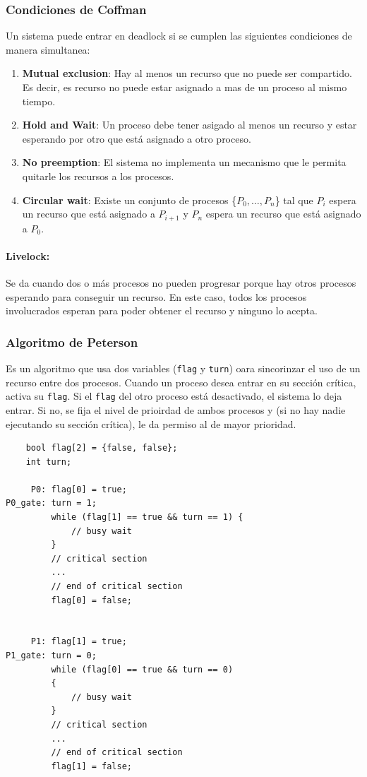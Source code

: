 \subsubsection{Condiciones de Coffman}
Un sistema puede entrar en deadlock si se cumplen las siguientes condiciones de manera simultanea:

\begin{enumerate}
    \item\textbf{Mutual exclusion}: Hay al menos un recurso que no puede ser compartido. Es decir, es recurso no puede estar asignado a mas de un proceso al mismo tiempo.
    \item \textbf{Hold and Wait}: Un proceso debe tener asigado al menos un recurso y estar esperando por otro que está asignado a otro proceso.
    \item \textbf{No preemption}: El sistema no implementa un mecanismo que le permita quitarle los recursos a los procesos.
    \item \textbf{Circular wait}: Existe un conjunto de procesos \{$P_0,\dots,P_n$\} tal que $P_i$ espera un recurso que está asignado a $P_{i+1}$ y $P_n$ espera un recurso que está asignado a $P_0$.
\end{enumerate}

\paragraph{Livelock:} Se da cuando dos o más procesos no pueden progresar porque hay otros procesos esperando para conseguir un recurso. En este caso, todos los procesos involucrados esperan para poder obtener el recurso y ninguno lo acepta.

\subsubsection{Algoritmo de Peterson}
Es un algoritmo que usa dos variables (\texttt{flag} y \texttt{turn}) oara sincorinzar el uso de un recurso entre dos procesos. Cuando un proceso desea entrar en su sección crítica, activa su \texttt{flag}. Si el \texttt{flag} del otro proceso está desactivado, el sistema lo deja entrar. Si no, se fija el nivel de prioirdad de ambos procesos y (si no hay nadie ejecutando su sección crítica), le da permiso al de mayor prioridad.

\begin{verbatim}
    bool flag[2] = {false, false};
    int turn;
    
     P0: flag[0] = true;
P0_gate: turn = 1;
         while (flag[1] == true && turn == 1) {
             // busy wait
         }
         // critical section
         ...
         // end of critical section
         flag[0] = false;


     P1: flag[1] = true;
P1_gate: turn = 0;
         while (flag[0] == true && turn == 0)
         {
             // busy wait
         }
         // critical section
         ...
         // end of critical section
         flag[1] = false;

    \end{verbatim}

